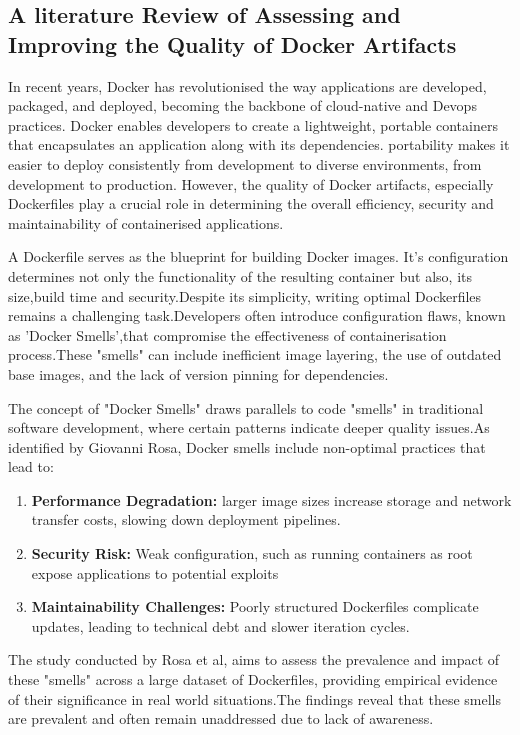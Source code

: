 \subsection{A literature Review of Assessing and Improving the Quality of Docker Artifacts
}
In recent years, Docker has revolutionised the way applications are developed, packaged, and deployed, becoming the backbone of cloud-native and Devops practices. Docker enables developers to create a lightweight, portable containers that encapsulates an application along with its dependencies. portability makes it easier to deploy consistently from development to diverse environments, from development to production. However, the quality of Docker artifacts, especially Dockerfiles play a crucial role in determining the overall efficiency, security and maintainability of containerised applications.

A Dockerfile serves as the blueprint for building Docker images. It's configuration determines not only the functionality of the resulting container but also, its size,build time and security.Despite its simplicity, writing optimal Dockerfiles remains a challenging task.Developers often introduce configuration flaws, known as 'Docker Smells',that compromise the effectiveness of containerisation process.These "smells" can include inefficient image layering, the use of outdated base images, and the lack of version pinning for dependencies.\cite{acharya2021docker}

The concept of "Docker Smells" draws parallels to code "smells" in traditional software development, where certain patterns indicate deeper quality issues.As identified by Giovanni Rosa, Docker smells include non-optimal practices that lead to:
\begin{enumerate}
    \item \textbf{Performance Degradation:} larger image sizes increase storage and network transfer costs, slowing down deployment pipelines.
    \item \textbf{Security Risk:} Weak configuration, such as running containers as root expose applications to potential exploits
    \item \textbf{Maintainability Challenges:} Poorly structured Dockerfiles complicate updates, leading to technical debt and slower iteration cycles. \cite{DockerArtifacts}
\end{enumerate}

The study conducted by Rosa et al, aims to assess the prevalence and impact of these "smells" across a large dataset of Dockerfiles, providing empirical evidence of their significance in real world situations.The findings reveal that these smells are prevalent and often remain unaddressed due to lack of awareness. 

